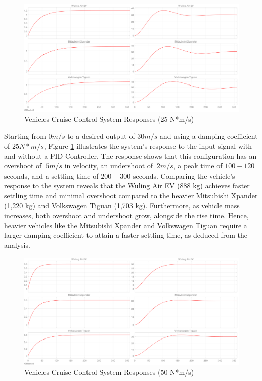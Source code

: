 \documentclass{article}
\begin{document}
\begin{figure}[htbp]
    \centering
    \includegraphics[width=1\linewidth]{img/25_Nms.png}
    \caption{Vehicles Cruise Control System Responses (25 N*m/s)}
    \label{fig:25nms}
\end{figure}

Starting from $0 m/s$ to a desired output of $30 m/s$ and using a damping coefficient of $25 N*m / s$, Figure \ref{fig:25nms} illustrates the system's response to the input signal with and without a PID Controller. The response shows that this configuration has an overshoot of $~5 m/s$ in velocity, an undershoot of $~2 m/s$, a peak time of $100 - 120$ seconds, and a settling time of $200 - 300$ seconds. Comparing the vehicle's response to the system reveals that the Wuling Air EV (888 kg) achieves faster settling time and minimal overshoot compared to the heavier Mitsubishi Xpander (1,220 kg) and Volkswagen Tiguan (1,703 kg). Furthermore, as vehicle mass increases, both overshoot and undershoot grow, alongside the rise time. Hence, heavier vehicles like the Mitsubishi Xpander and Volkswagen Tiguan require a larger damping coefficient to attain a faster settling time, as deduced from the analysis.

\begin{figure}[htbp]
    \centering
    \includegraphics[width=1\linewidth]{img/50_Nms.png}
    \caption{Vehicles Cruise Control System Responses (50 N*m/s)}
    \label{fig:50nms}
\end{figure}
\end{document}
